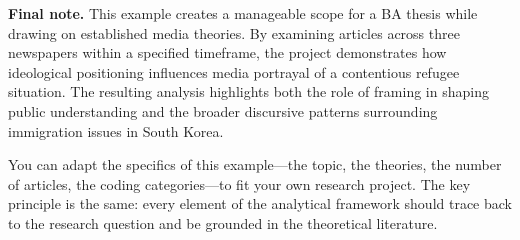 \documentclass[11pt,a4paper]{article}
\begin{document}
\begin{tipbox}
\textbf{Final note.} This example creates a manageable scope for a BA thesis while drawing on established media theories. By examining articles across three newspapers within a specified timeframe, the project demonstrates how ideological positioning influences media portrayal of a contentious refugee situation. The resulting analysis highlights both the role of framing in shaping public understanding and the broader discursive patterns surrounding immigration issues in South Korea.

\medskip

You can adapt the specifics of this example---the topic, the theories, the number of articles, the coding categories---to fit your own research project. The key principle is the same: every element of the analytical framework should trace back to the research question and be grounded in the theoretical literature.
\end{tipbox}
\end{document}
